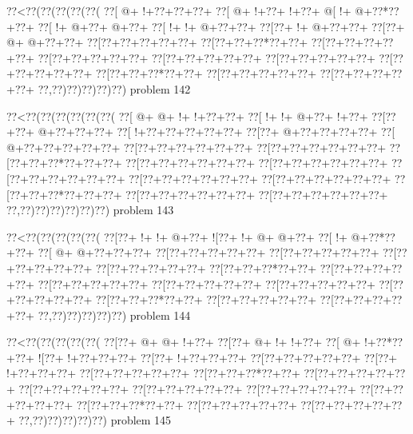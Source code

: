 \vbox{\vbox{\goo
\0??<\0??(\0??(\0??(\0??(\0??(
\0??[\- @+\- !+\0??+\0??+\0??+
\0??[\- @+\- !+\0??+\- !+\0??+
\- @[\- !+\- @+\0??*\0??+\0??+
\0??[\- !+\- @+\0??+\- @+\0??+
\0??[\- !+\- !+\- @+\0??+\0??+
\0??[\0??+\- !+\- @+\0??+\0??+
\0??[\0??+\- @+\- @+\0??+\0??+
\0??[\0??+\0??+\0??+\0??+\0??+
\0??[\0??+\0??+\0??*\0??+\0??+
\0??[\0??+\0??+\0??+\0??+\0??+
\0??[\0??+\0??+\0??+\0??+\0??+
\0??[\0??+\0??+\0??+\0??+\0??+
\0??[\0??+\0??+\0??+\0??+\0??+
\0??[\0??+\0??+\0??+\0??+\0??+
\0??[\0??+\0??+\0??*\0??+\0??+
\0??[\0??+\0??+\0??+\0??+\0??+
\0??[\0??+\0??+\0??+\0??+\0??+
\0??,\0??)\0??)\0??)\0??)\0??)
}
\hfil problem 142\hfil\break
}

\vbox{\vbox{\goo
\0??<\0??(\0??(\0??(\0??(\0??(\0??(
\0??[\- @+\- @+\- !+\- !+\0??+\0??+
\0??[\- !+\- !+\- @+\0??+\- !+\0??+
\0??[\0??+\0??+\- @+\0??+\0??+\0??+
\0??[\- !+\0??+\0??+\0??+\0??+\0??+
\0??[\0??+\- @+\0??+\0??+\0??+\0??+
\0??[\- @+\0??+\0??+\0??+\0??+\0??+
\0??[\0??+\0??+\0??+\0??+\0??+\0??+
\0??[\0??+\0??+\0??+\0??+\0??+\0??+
\0??[\0??+\0??+\0??*\0??+\0??+\0??+
\0??[\0??+\0??+\0??+\0??+\0??+\0??+
\0??[\0??+\0??+\0??+\0??+\0??+\0??+
\0??[\0??+\0??+\0??+\0??+\0??+\0??+
\0??[\0??+\0??+\0??+\0??+\0??+\0??+
\0??[\0??+\0??+\0??+\0??+\0??+\0??+
\0??[\0??+\0??+\0??*\0??+\0??+\0??+
\0??[\0??+\0??+\0??+\0??+\0??+\0??+
\0??[\0??+\0??+\0??+\0??+\0??+\0??+
\0??,\0??)\0??)\0??)\0??)\0??)\0??)
}
\hfil problem 143\hfil\break
}

\vbox{\vbox{\goo
\0??<\0??(\0??(\0??(\0??(\0??(
\0??[\0??+\- !+\- !+\- @+\0??+
\- ![\0??+\- !+\- @+\- @+\0??+
\0??[\- !+\- @+\0??*\0??+\0??+
\0??[\- @+\- @+\0??+\0??+\0??+
\0??[\0??+\0??+\0??+\0??+\0??+
\0??[\0??+\0??+\0??+\0??+\0??+
\0??[\0??+\0??+\0??+\0??+\0??+
\0??[\0??+\0??+\0??+\0??+\0??+
\0??[\0??+\0??+\0??*\0??+\0??+
\0??[\0??+\0??+\0??+\0??+\0??+
\0??[\0??+\0??+\0??+\0??+\0??+
\0??[\0??+\0??+\0??+\0??+\0??+
\0??[\0??+\0??+\0??+\0??+\0??+
\0??[\0??+\0??+\0??+\0??+\0??+
\0??[\0??+\0??+\0??*\0??+\0??+
\0??[\0??+\0??+\0??+\0??+\0??+
\0??[\0??+\0??+\0??+\0??+\0??+
\0??,\0??)\0??)\0??)\0??)\0??)
}
\hfil problem 144\hfil\break
}

\vbox{\vbox{\goo
\0??<\0??(\0??(\0??(\0??(\0??(
\0??[\0??+\- @+\- @+\- !+\0??+
\0??[\0??+\- @+\- !+\- !+\0??+
\0??[\- @+\- !+\0??*\0??+\0??+
\- ![\0??+\- !+\0??+\0??+\0??+
\0??[\0??+\- !+\0??+\0??+\0??+
\0??[\0??+\0??+\0??+\0??+\0??+
\0??[\0??+\- !+\0??+\0??+\0??+
\0??[\0??+\0??+\0??+\0??+\0??+
\0??[\0??+\0??+\0??*\0??+\0??+
\0??[\0??+\0??+\0??+\0??+\0??+
\0??[\0??+\0??+\0??+\0??+\0??+
\0??[\0??+\0??+\0??+\0??+\0??+
\0??[\0??+\0??+\0??+\0??+\0??+
\0??[\0??+\0??+\0??+\0??+\0??+
\0??[\0??+\0??+\0??*\0??+\0??+
\0??[\0??+\0??+\0??+\0??+\0??+
\0??[\0??+\0??+\0??+\0??+\0??+
\0??,\0??)\0??)\0??)\0??)\0??)
}
\hfil problem 145\hfil\break
}

